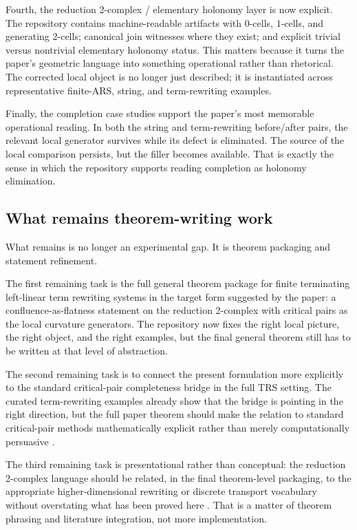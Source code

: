 \documentclass[11pt]{article}
\numberwithin{equation}{section}
\theoremstyle{definition}
\theoremstyle{remark}
\begin{document}
Fourth, the reduction 2-complex / elementary holonomy layer is now explicit. The repository contains machine-readable artifacts with $0$-cells, $1$-cells, and generating $2$-cells; canonical join witnesses where they exist; and explicit trivial versus nontrivial elementary holonomy status. This matters because it turns the paper's geometric language into something operational rather than rhetorical. The corrected local object is no longer just described; it is instantiated across representative finite-ARS, string, and term-rewriting examples.

Finally, the completion case studies support the paper's most memorable operational reading. In both the string and term-rewriting before/after pairs, the relevant local generator survives while its defect is eliminated. The source of the local comparison persists, but the filler becomes available. That is exactly the sense in which the repository supports reading completion as holonomy elimination.

\subsection{What remains theorem-writing work}
\label{subsec:what-remains}

What remains is no longer an experimental gap. It is theorem packaging and statement refinement.

The first remaining task is the full general theorem package for finite terminating left-linear term rewriting systems in the target form suggested by the paper: a confluence-as-flatness statement on the reduction 2-complex with critical pairs as the local curvature generators. The repository now fixes the right local picture, the right object, and the right examples, but the final general theorem still has to be written at that level of abstraction.

The second remaining task is to connect the present formulation more explicitly to the standard critical-pair completeness bridge in the full TRS setting. The curated term-rewriting examples already show that the bridge is pointing in the right direction, but the full paper theorem should make the relation to standard critical-pair methods mathematically explicit rather than merely computationally persuasive \cite{KnuthBendix1970,BaaderNipkow1998,Terese2003,SquierOtto1987,GramlichLucas2006}.

The third remaining task is presentational rather than conceptual: the reduction 2-complex language should be related, in the final theorem-level packaging, to the appropriate higher-dimensional rewriting or discrete transport vocabulary without overstating what has been proved here \cite{Mimram2023,GuiraudMalbos2018,GuiraudMalbos2012,Meneses2021,BaezMuniain1994}. That is a matter of theorem phrasing and literature integration, not more implementation.
\end{document}
